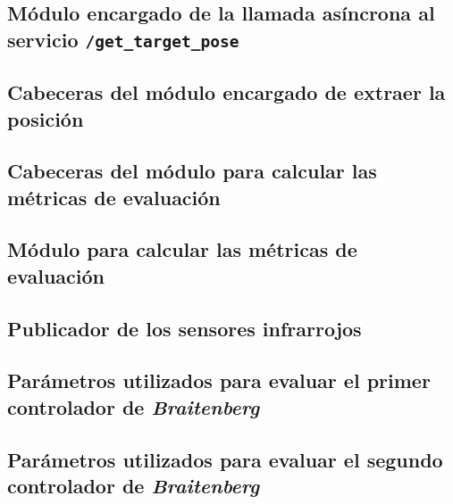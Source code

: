 \subsection*{Módulo encargado de la llamada asíncrona al servicio \texttt{/get\_target\_pose}}


\subsection*{Cabeceras del módulo encargado de extraer la posición}


\subsection*{Cabeceras del módulo para calcular las métricas de evaluación}


\subsection*{Módulo para calcular las métricas de evaluación}


\subsection*{Publicador de los sensores infrarrojos}


\subsection*{Parámetros utilizados para evaluar el primer controlador de \textit{Braitenberg}}


\subsection*{Parámetros utilizados para evaluar el segundo controlador de \textit{Braitenberg}}

